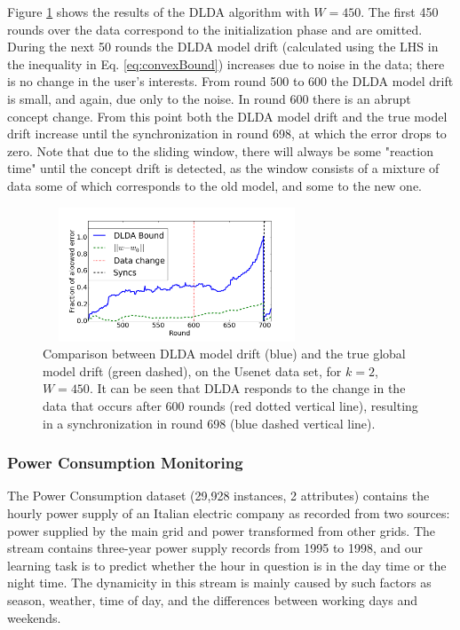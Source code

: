 Figure \ref{usenet} shows the results of the DLDA algorithm with $W=450$. The first 450 rounds over the data correspond to
the initialization phase and are omitted. During the next 50 rounds the DLDA model drift 
(calculated using the LHS in the inequality in Eq. \ref{eq:convexBound}) 
increases due to noise in the data; there is no change in the user's
interests.
From round 500 to 600 the DLDA model drift is small, and again, due only to the noise. In round 600 there is an abrupt concept
change.
From this point both the DLDA model drift and the true model drift increase until the synchronization 
in round 698, at which the error drops to zero. Note that due to the sliding window,
there will always be some "reaction time" until the concept drift is detected, as
the window consists of a mixture of data some of which corresponds to the old
model, and some to the new one.
\begin{figure}[H]
	\centering
	\includegraphics[width=8cm, height=40mm]{graphics/DriftDetected.png}
	\caption{Comparison between DLDA model drift (blue)
	and the true global model drift (green dashed), on the Usenet data set, for $k=2$, $W=450$. It can be seen that DLDA responds to the change in the data that occurs after 600 rounds (red dotted vertical line), resulting in a synchronization in 
	round 698 (blue dashed vertical line).}
	\label{usenet}
	\end{figure}
	

%
%
\subsubsection{Power Consumption Monitoring}


The Power Consumption dataset  \cite{powerSupply} (29,928 instances, 2 attributes) contains the hourly power supply of an
Italian electric company as recorded from two sources: power supplied
by the main grid and power transformed from other grids.
The stream contains three-year power supply records
from 1995 to 1998, and our learning task is to predict whether the hour 
in question is in the day time or the night time.
The dynamicity in this stream is mainly caused by such factors as season, weather, time of day, and the differences between working days and weekends.




